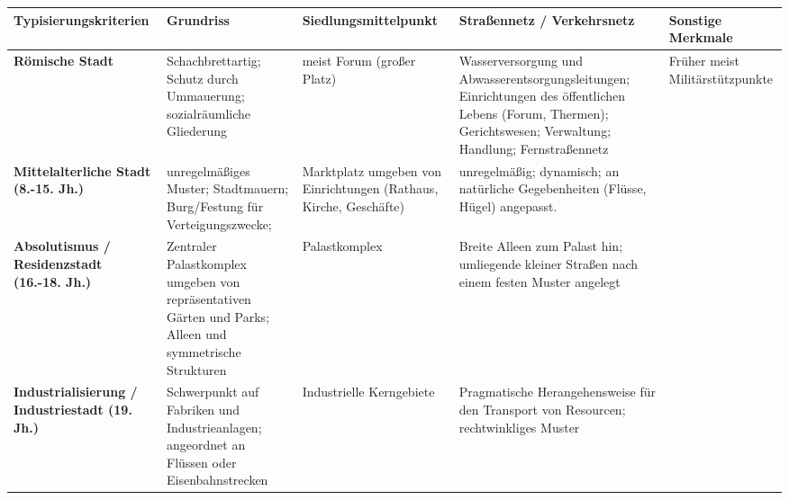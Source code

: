 \documentclass[12pt]{report}
\begin{document}
	\thispagestyle{empty}
	\begin{tabularx}{\textwidth}{|X|X|X|X|X|}
		\hline
		\textbf{Typisierungskriterien} & \textbf{Grundriss} & \textbf{Siedlungsmittelpunkt} & \textbf{Straßennetz / Verkehrsnetz} & \textbf{Sonstige Merkmale} \\
		\hline
		\textbf{Römische Stadt} & Schachbrettartig; Schutz durch Ummauerung; sozialräumliche Gliederung&meist Forum (großer Platz)& Wasserversorgung und Abwasserentsorgungsleitungen; Einrichtungen des öffentlichen Lebens (Forum, Thermen); Gerichtswesen; Verwaltung; Handlung; Fernstraßennetz & Früher meist Militärstützpunkte \\
		\hline
		\textbf{Mittelalterliche Stadt (8.-15. Jh.)} &unregelmäßiges Muster; Stadtmauern; Burg/Festung für Verteigungszwecke;&Marktplatz umgeben von Einrichtungen (Rathaus, Kirche, Geschäfte)&unregelmäßig; dynamisch; an natürliche Gegebenheiten (Flüsse, Hügel) angepasst.& \\
		\hline
		\textbf{Absolutismus / Residenzstadt (16.-18. Jh.)} &Zentraler Palastkomplex umgeben von repräsentativen Gärten und Parks; Alleen und symmetrische Strukturen&Palastkomplex&Breite Alleen zum Palast hin; umliegende kleiner Straßen nach einem festen Muster angelegt& \\
		\hline
		\textbf{Industrialisierung / Industriestadt (19. Jh.)} &Schwerpunkt auf Fabriken und Industrieanlagen; angeordnet an Flüssen oder Eisenbahnstrecken&Industrielle Kerngebiete&Pragmatische Herangehensweise für den Transport von Resourcen; rechtwinkliges Muster& \\
		\hline
		
	\end{tabularx}
\end{document}
